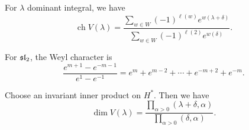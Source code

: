 \documentclass[twoside, 10pt]{article}
\begin{document}
    \begin{thm} For $\lambda$ dominant integral, we
        have \[ \operatorname{ch} V(\lambda) = \frac{ \sum_{w \in W}
        (-1)^{\ell(w)} e^{w(\lambda + \delta)} }{\sum_{w \in W}
(-1)^{\ell(2)}e^{w(\delta)}}.\] \end{thm}

    \begin{exm} For $\mathfrak{sl}_2$, the Weyl character is \[ \frac{e^{m+1} -
    e^{-m-1}}{e^1 - e^{-1}} = e^m + e^{m-2} + \cdots + e^{-m+2} + e^{-m}.\]
\end{exm}

    \begin{thm} Choose an invariant inner product on
        $H^*$. Then we have \[ \dim V(\lambda) = \frac{\prod_{\alpha > 0}
        (\lambda + \delta, \alpha)}{\prod_{\alpha > 0} (\delta, \alpha)}.\]
    \end{thm}
\end{document}
